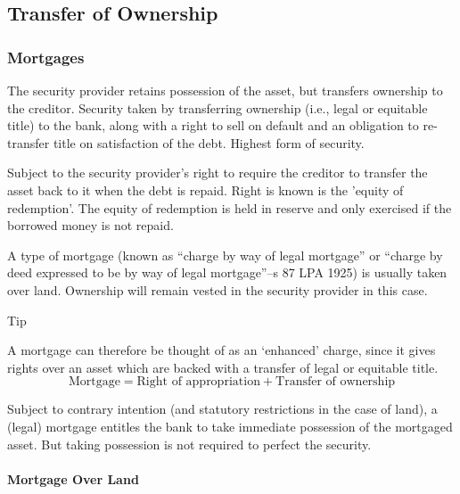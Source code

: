 \documentclass[
]{article}
\newenvironment{env-0c49cb39-e036-4df4-8974-f6a48144dfd4}
{
    \savenotes\tcolorbox[blanker,breakable,left=5pt,borderline west={2pt}{-4pt}{cyan}]
}
{
    \endtcolorbox\spewnotes
}
\begin{document}
\hypertarget{transfer-of-ownership}{%
\subsection{Transfer of Ownership}\label{transfer-of-ownership}}

\hypertarget{mortgages}{%
\subsubsection{Mortgages}\label{mortgages}}

The security provider retains possession of the asset, but transfers
ownership to the creditor. Security taken by transferring ownership
(i.e., legal or equitable title) to the bank, along with a right to sell
on default and an obligation to re-transfer title on satisfaction of the
debt. Highest form of security.

Subject to the security provider's right to require the creditor to
transfer the asset back to it when the debt is repaid. Right is known is
the 'equity of redemption'. The equity of redemption is held in reserve
and only exercised if the borrowed money is not repaid.

A type of mortgage (known as ``charge by way of legal mortgage'' or
``charge by deed expressed to be by way of legal mortgage''--s 87 LPA
1925) is usually taken over land. Ownership will remain vested in the
security provider in this case.

\begin{env-0c49cb39-e036-4df4-8974-f6a48144dfd4}

Tip

A mortgage can therefore be thought of as an `enhanced' charge, since it
gives rights over an asset which are backed with a transfer of legal or
equitable title.\\
{\[\text{Mortgage} = \text{Right\ of\ appropriation} + \text{Transfer\ of\ ownership}\]}

\end{env-0c49cb39-e036-4df4-8974-f6a48144dfd4}

Subject to contrary intention (and statutory restrictions in the case of
land), a (legal) mortgage entitles the bank to take immediate possession
of the mortgaged asset. But taking possession is not required to perfect
the security.

\hypertarget{mortgage-over-land}{%
\paragraph{Mortgage Over Land}\label{mortgage-over-land}}
\end{document}
